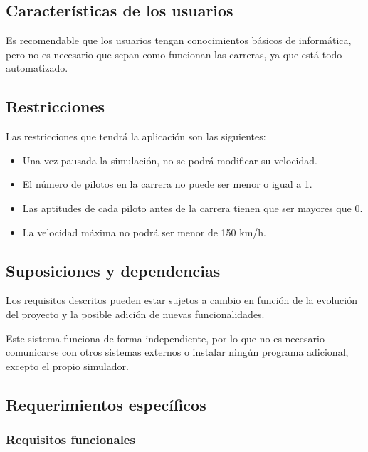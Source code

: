 \subsection{Características de los usuarios}

Es recomendable que los usuarios tengan conocimientos básicos de informática, pero no es necesario que sepan como funcionan las carreras, ya que está todo automatizado. 

\subsection{Restricciones}

Las restricciones que tendrá la aplicación son las siguientes:

\begin{itemize}
    \item Una vez pausada la simulación, no se podrá modificar su velocidad.
    \item El número de pilotos en la carrera no puede ser menor o igual a 1.
    \item Las aptitudes de cada piloto antes de la carrera tienen que ser mayores que 0.
    \item La velocidad máxima no podrá ser menor de 150 km/h.
\end{itemize}

\subsection{Suposiciones y dependencias}

Los requisitos descritos pueden estar sujetos a cambio en función de la evolución del proyecto y la posible adición de nuevas funcionalidades. 

Este sistema funciona de forma independiente, por lo que no es necesario comunicarse con otros sistemas externos o instalar ningún programa adicional, excepto el propio simulador.

\subsection{Requerimientos específicos}

\subsubsection{Requisitos funcionales}

